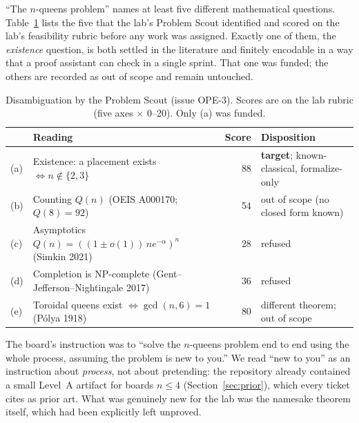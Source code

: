 \documentclass[11pt,a4paper]{article}
\theoremstyle{definition}
\theoremstyle{remark}
\begin{document}
``The $n$-queens problem'' names at least five different mathematical questions.
Table~\ref{tab:readings} lists the five that the lab's Problem Scout identified and
scored on the lab's feasibility rubric before any work was assigned. Exactly one of them,
the \emph{existence} question, is both settled in the literature and finitely encodable in
a way that a proof assistant can check in a single sprint. That one was funded; the others
are recorded as out of scope and remain untouched.

\begin{table}[ht]
\centering\small
\begin{tabular}{@{}l>{\raggedright\arraybackslash}p{7.2cm}r>{\raggedright\arraybackslash}p{4.2cm}@{}}
\toprule
& Reading & Score & Disposition \\
\midrule
(a) & Existence: a placement exists $\iff n\notin\{2,3\}$ & 88 & \textbf{target}; known-classical, formalize-only \\
(b) & Counting $Q(n)$ (OEIS A000170; $Q(8)=92$) & 54 & out of scope (no closed form known) \\
(c) & Asymptotics $Q(n)=((1\pm o(1))\,n e^{-\alpha})^n$ (Simkin 2021) & 28 & refused \\
(d) & Completion is NP-complete (Gent--Jefferson--Nightingale 2017) & 36 & refused \\
(e) & Toroidal queens exist $\iff \gcd(n,6)=1$ (Pólya 1918) & 80 & different theorem; out of scope \\
\bottomrule
\end{tabular}
\caption{Disambiguation by the Problem Scout (issue OPE-3). Scores are on the lab rubric
(five axes $\times$ 0--20). Only (a) was funded.}
\label{tab:readings}
\end{table}

The board's instruction was to ``solve the $n$-queens problem end to end using the whole
process, assuming the problem is new to you.'' We read ``new to you'' as an instruction
about \emph{process}, not about pretending: the repository already contained a small
Level~A artifact for boards $n\le 4$ (Section~\ref{sec:prior}), which every ticket cites as
prior art. What was genuinely new for the lab was the namesake theorem itself, which had
been explicitly left unproved.
\end{document}
